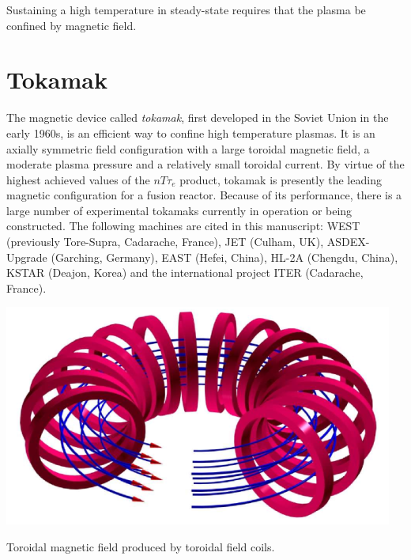 Sustaining a high temperature in steady-state requires that the plasma be confined by magnetic field.

\section{Tokamak}
The magnetic device called \emph{tokamak}, first developed in the Soviet Union in the early 1960s, is an efficient way to confine high temperature plasmas. It is an axially symmetric field configuration with a large toroidal magnetic field, a moderate plasma pressure and a relatively small toroidal current. By virtue of the highest achieved values of the $n T \tau_e$ product, tokamak is presently the leading magnetic configuration for a fusion reactor. Because of its performance, there is a large number of experimental tokamaks currently in operation or being constructed. The following machines are cited in this manuscript: WEST (previously Tore-Supra, Cadarache, France), JET (Culham, UK), ASDEX-Upgrade (Garching, Germany), EAST (Hefei, China), HL-2A (Chengdu, China), KSTAR (Deajon, Korea) and the international project ITER (Cadarache, France).

\begin{marginfigure}[0cm]
	\includegraphics[width=1\linewidth]{figures/chap1/tokamak_toroidal_field}
	\caption{Toroidal magnetic field produced by toroidal field coils.}
	\label{fig:tokamak_toroidal_field}
\end{marginfigure}

